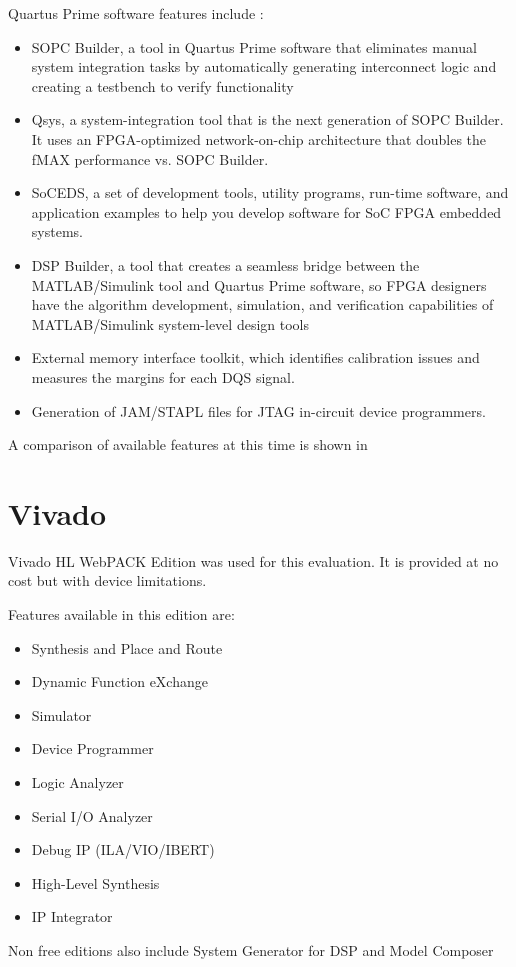 Quartus Prime software features include \cite{Wikipedia_Quartus}:
\begin{itemize}
\item SOPC Builder, a tool in Quartus Prime software that eliminates manual system integration tasks by automatically generating interconnect logic and creating a testbench to verify functionality
\item Qsys, a system-integration tool that is the next generation of SOPC Builder. It uses an FPGA-optimized network-on-chip architecture that doubles the fMAX performance vs. SOPC Builder.
\item SoCEDS, a set of development tools, utility programs, run-time software, and application examples to help you develop software for SoC FPGA embedded systems.
\item DSP Builder, a tool that creates a seamless bridge between the MATLAB/Simulink tool and Quartus Prime software, so FPGA designers have the algorithm development, simulation, and verification capabilities of MATLAB/Simulink system-level design tools
\item External memory interface toolkit, which identifies calibration issues and measures the margins for each DQS signal.
\item Generation of JAM/STAPL files for JTAG in-circuit device programmers.
\end{itemize}

A comparison of available features at this time is shown in 

\section{Vivado}
Vivado HL WebPACK Edition was used for this evaluation. It is provided at no cost but with device limitations.

Features available in this edition are:
\begin{itemize}
    \item Synthesis and Place and Route
    \item Dynamic Function eXchange
    \item Simulator
    \item Device Programmer
    \item Logic Analyzer
    \item Serial I/O Analyzer
    \item Debug IP (ILA/VIO/IBERT)	\item High-Level Synthesis
    \item IP Integrator
\end{itemize}

Non free editions also include System Generator for DSP and Model Composer